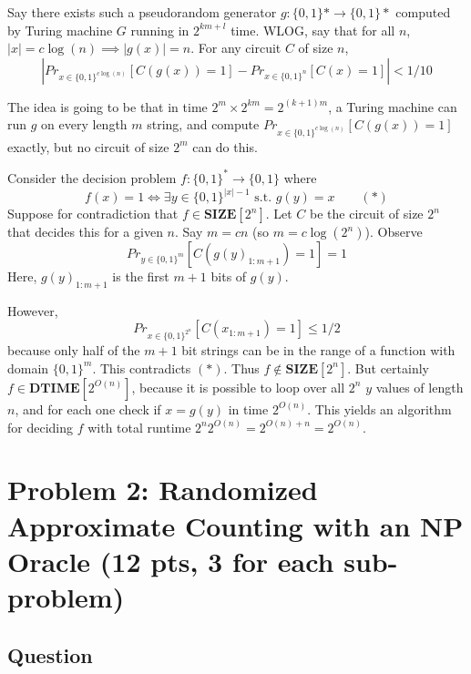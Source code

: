 \documentclass{article}
\newcommand{\DTIME}{\mathbf{DTIME}}
\newcommand{\SIZE}{\mathbf{SIZE}}
\begin{document}
Say there exists such a pseudorandom generator $g : \{0, 1\}* \to \{0, 1\}*$ computed
by Turing machine $G$ running in $2^{km + l}$ time.
WLOG, say that for all $n$, $|x| = c \log(n) \implies |g(x)| = n$.
For any circuit $C$ of size $n$,
$$
|Pr_{x \in \{0, 1\}^{c \log(n)}}[C(g(x)) = 1] - Pr_{x \in \{0, 1\}^n}[C(x) = 1] | < 1/10
$$

The idea is going to be that in time $2^m \times 2^{km} = 2^{(k+1)m}$, a Turing machine can run $g$ on every length $m$ string, and compute $Pr_{x \in \{0, 1\}^{c \log(n)}}[C(g(x)) = 1]$ exactly, but no circuit of size $2^m$ can do this.


Consider the decision problem $f : \{0, 1\}^* \to \{0, 1\}$ where
$$
f(x) = 1 \iff \exists y \in \{0, 1\}^{|x| - 1} \text{ s.t. } g(y) = x \qquad (*)
$$
Suppose for contradiction that $f \in \SIZE[2^n]$.
Let $C$ be the circuit of size $2^n$ that decides this for a given $n$.
Say $m = cn$ (so $m = c\log(2^n)$).
Observe
$$
Pr_{y \in \{0, 1\}^m}[C(g(y)_{1:m+1}) = 1] = 1
$$
Here, $g(y)_{1:m+1}$ is the first $m+1$ bits of $g(y)$.

However, 
$$
Pr_{x \in \{0, 1\}^{2^n}}[C(x_{1:m+1}) = 1] \leq 1/2
$$
because only half of the $m+1$ bit strings can be in the range of a function with domain $\{0, 1\}^m$.
This contradicts $(*)$.
Thus $f \notin \SIZE[2^n]$.
But certainly $f \in \DTIME[2^{O(n)}]$, because it is possible to loop over all $2^n$ $y$ values of length $n$, and for each one check if $x = g(y)$ in time $2^{O(n)}$.  This yields an algorithm for deciding $f$ with total runtime $2^n 2^{O(n)} = 2^{O(n) + n} = 2^{O(n)}$.



\newpage
\section*{Problem 2: Randomized Approximate Counting with an NP Oracle (12 pts, 3 for each sub-problem)}

\subsection*{Question}
\end{document}
